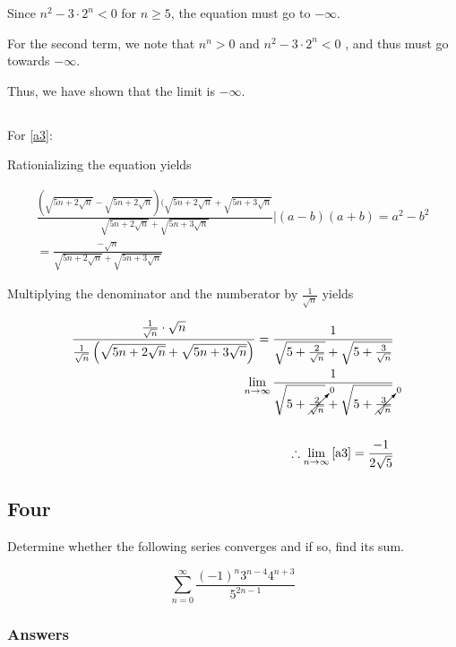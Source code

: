 \documentclass{article}
\begin{document}
Since $n^2-3 \cdot 2^n < 0$ for $n \geq 5$, the equation must go to $- \infty$.

For the second term, we note that $n^n >0$ and $n^2 - 3 \cdot 2^n < 0$ , and thus must go towards $-\infty$.

Thus, we have shown that the limit is $-\infty$.


\par
\subsection*{}

For \ref{a3}:

Rationializing the equation yields

\begin{align*}
\frac{(\sqrt{5n+2\sqrt{n}}-\sqrt{5n+2\sqrt{n}})(\sqrt{5n+2\sqrt{n}}+\sqrt{5n+3\sqrt{n}}} {\sqrt{5n+2\sqrt{n}}+\sqrt{5n+3\sqrt{n}}} \Bigr| (a-b)(a+b)=a^2-b^2\\
= \frac{-\sqrt{n}}{\sqrt{5n+2\sqrt{n}}+\sqrt{5n+3\sqrt{n}}}
\end{align*}

Multiplying the denominator and the numberator by $\frac{1}{\sqrt{n}}$ yields

\begin{align*}
\frac{\frac{1}{\sqrt{n}} \cdot \sqrt{n}}{ \frac{1}{\sqrt{n}}\left(\sqrt{5n+2\sqrt{n}}+\sqrt{5n+3\sqrt{n}}\right)} = \frac{1}{ \sqrt{5+\frac{2}{\sqrt{n}}}+\sqrt{5+\frac{3}{\sqrt{n}}}}\\
\lim_{n\to\infty} \frac{1}{ \sqrt{5+\cancelto{0}{\frac{2}{\sqrt{n}}}}+\sqrt{5+\cancelto{0}{\frac{3}{\sqrt{n}}}}}\\\\
\therefore \lim_{n\to\infty} \ref{a3} = \frac{-1}{2\sqrt{5}}
\end{align*}
\par

\subsection*{Four}

Determine whether the following series converges and if so, find its sum.

\begin{equation}\label{a4}
\sum_{n=0}^{\infty} \frac {(-1)^n3^{n-4}4^{n+3}}{5^{2n-1}}
\end{equation}

\subsubsection*{Answers}
\end{document}
